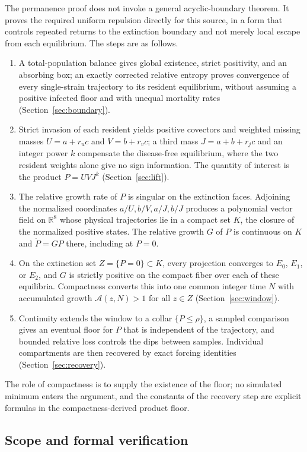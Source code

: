 \documentclass[11pt,a4paper]{article}
\theoremstyle{plain}
\theoremstyle{definition}
\theoremstyle{remark}
\newcommand{\R}{\mathbb R}
\newcommand{\cA}{\mathcal A}
\begin{document}
The permanence proof does not invoke a general acyclic-boundary theorem. It proves the required uniform repulsion directly for this source, in a form that controls repeated returns to the extinction boundary and not merely local escape from each equilibrium. The steps are as follows.
\begin{enumerate}
\item A total-population balance gives global existence, strict positivity, and an absorbing box; an exactly corrected relative entropy proves convergence of every single-strain trajectory to its resident equilibrium, without assuming a positive infected floor and with unequal mortality rates (Section~\ref{sec:boundary}).
\item Strict invasion of each resident yields positive covectors and weighted missing masses $U=a+r_uc$ and $V=b+r_vc$; a third mass $J=a+b+r_jc$ and an integer power $k$ compensate the disease-free equilibrium, where the two resident weights alone give no sign information. The quantity of interest is the product $P=UVJ^k$ (Section~\ref{sec:lift}).
\item The relative growth rate of $P$ is singular on the extinction faces. Adjoining the normalized coordinates $a/U,b/V,a/J,b/J$ produces a polynomial vector field on $\R^8$ whose physical trajectories lie in a compact set $K$, the closure of the normalized positive states. The relative growth $G$ of $P$ is continuous on $K$ and $\dot P=GP$ there, including at $P=0$.
\item On the extinction set $Z=\{P=0\}\subset K$, every projection converges to $E_0$, $E_1$, or $E_2$, and $G$ is strictly positive on the compact fiber over each of these equilibria. Compactness converts this into one common integer time $N$ with accumulated growth $\cA(z,N)>1$ for all $z\in Z$ (Section~\ref{sec:window}).
\item Continuity extends the window to a collar $\{P\le\rho\}$, a sampled comparison gives an eventual floor for $P$ that is independent of the trajectory, and bounded relative loss controls the dips between samples. Individual compartments are then recovered by exact forcing identities (Section~\ref{sec:recovery}).
\end{enumerate}
The role of compactness is to supply the existence of the floor; no simulated minimum enters the argument, and the constants of the recovery step are explicit formulas in the compactness-derived product floor.

\subsection{Scope and formal verification}
\end{document}
